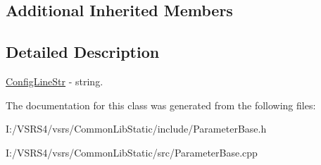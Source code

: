 \subsection*{Additional Inherited Members}


\subsection{Detailed Description}
\hyperlink{class_config_line_str}{Config\+Line\+Str} -\/ string. 

The documentation for this class was generated from the following files\+:\begin{DoxyCompactItemize}
\item 
I\+:/\+V\+S\+R\+S4/vsrs/\+Common\+Lib\+Static/include/Parameter\+Base.\+h\item 
I\+:/\+V\+S\+R\+S4/vsrs/\+Common\+Lib\+Static/src/Parameter\+Base.\+cpp\end{DoxyCompactItemize}
